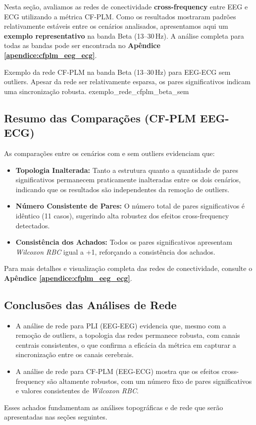 Nesta seção, avaliamos as redes de conectividade \textbf{cross-frequency} entre EEG e ECG utilizando a métrica CF-PLM. Como os resultados mostraram padrões relativamente estáveis entre os cenários analisados, apresentamos aqui um \textbf{exemplo representativo} na banda Beta (13--30\,Hz). A análise completa para todas as bandas pode ser encontrada no \textbf{Apêndice \ref{apendice:cfplm_eeg_ecg}}.

{Exemplo da rede CF-PLM na banda Beta (13--30\,Hz) para EEG-ECG sem outliers. Apesar da rede ser relativamente esparsa, os pares significativos indicam uma sincronização robusta.}
{exemplo_rede_cfplm_beta_sem}

\subsection{Resumo das Comparações (CF-PLM EEG-ECG)}

As comparações entre os cenários com e sem outliers evidenciam que:
\begin{itemize}
    \item \textbf{Topologia Inalterada:} Tanto a estrutura quanto a quantidade de pares significativos permanecem praticamente inalteradas entre os dois cenários, indicando que os resultados são independentes da remoção de outliers.
    \item \textbf{Número Consistente de Pares:} O número total de pares significativos é idêntico (11 casos), sugerindo alta robustez dos efeitos cross-frequency detectados.
    \item \textbf{Consistência dos Achados:} Todos os pares significativos apresentam \emph{Wilcoxon RBC} igual a +1, reforçando a consistência dos achados.
\end{itemize}

Para mais detalhes e visualização completa das redes de conectividade, consulte o \textbf{Apêndice \ref{apendice:cfplm_eeg_ecg}}.

\subsection{Conclusões das Análises de Rede}
\begin{itemize}
    \item A análise de rede para PLI (EEG-EEG) evidencia que, mesmo com a remoção de outliers, a topologia das redes permanece robusta, com canais centrais consistentes, o que confirma a eficácia da métrica em capturar a sincronização entre os canais cerebrais.
    \item A análise de rede para CF-PLM (EEG-ECG) mostra que os efeitos cross-frequency são altamente robustos, com um número fixo de pares significativos e valores consistentes de \emph{Wilcoxon RBC}.
\end{itemize}

Esses achados fundamentam as análises topográficas e de rede que serão apresentadas nas seções seguintes.